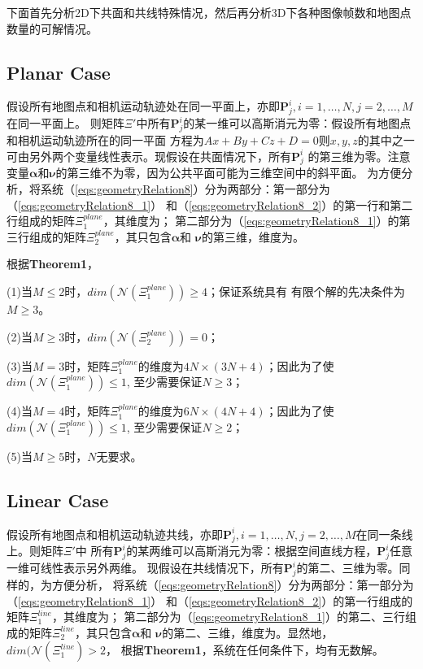 \documentclass{article}
\begin{document}
下面首先分析2D下共面和共线特殊情况，然后再分析3D下各种图像帧数和地图点数量的可解情况。
\subsection{Planar Case}
假设所有地图点和相机运动轨迹处在同一平面上，亦即$\textbf{P}_j^i,i=1,\dots,N,j=2,\dots,M$在同一平面上。
则矩阵$\Xi'$中所有$\textbf{P}_j^i$的某一维可以高斯消元为零：假设所有地图点和相机运动轨迹所在的同一平面
方程为$Ax+By+Cz+D=0$则$x,y,z$的其中之一可由另外两个变量线性表示。现假设在共面情况下，所有$\textbf{P}_j^i$
的第三维为零。注意变量$\mathbf{\alpha}$和$\mathbf{\nu}$的第三维不为零，因为公共平面可能为三维空间中的斜平面。
为方便分析，将系统（\ref{eqs:geometryRelation8}）分为两部分：第一部分为（\ref{eqs:geometryRelation8_1}）
和（\ref{eqs:geometryRelation8_2}）的第一行和第二行组成的矩阵$\Xi_1^{plane}$，其维度为{\color{red}{$2(M-1)N\times (MN+4)$}}；
第二部分为（\ref{eqs:geometryRelation8_1}）的第三行组成的矩阵$\Xi_2^{plane}$，其只包含$\mathbf{\alpha}$和
$\mathbf{\nu}$的第三维，维度为{\color{red}{$(M-1)\times 2$}}。
\par
根据\textbf{Theorem1}，
\par
(1)当$M\leqslant 2$时，$dim(\mathcal{N}(\Xi_1^{plane}))\geqslant 4$；保证系统具有
有限个解的先决条件为$M\geqslant 3$。
\par
(2)当$M\geqslant 3$时，$dim(\mathcal{N}(\Xi_2^{plane}))=0$；
\par
(3)当$M=3$时，矩阵$\Xi_1^{plane}$的维度为$4N\times (3N+4)$；因此为了使$dim(\mathcal{N}(\Xi_1^{plane}))\leqslant 1$,
至少需要保证$N\geqslant 3$；
\par
(4)当$M=4$时，矩阵$\Xi_1^{plane}$的维度为$6N\times (4N+4)$；因此为了使$dim(\mathcal{N}(\Xi_1^{plane}))\leqslant 1$,
至少需要保证$N\geqslant 2$；
\par
(5)当$M\geqslant 5$时，$N$无要求。

\subsection{Linear Case}
假设所有地图点和相机运动轨迹共线，亦即$\textbf{P}_j^i,i=1,\dots,N,j=2,\dots,M$在同一条线上。则矩阵$\Xi'$中
所有$\textbf{P}_j^i$的某两维可以高斯消元为零：根据空间直线方程，$\textbf{P}_j^i$任意一维可线性表示另外两维。
现假设在共线情况下，所有$\textbf{P}_j^i$的第二、三维为零。同样的，为方便分析，
将系统（\ref{eqs:geometryRelation8}）分为两部分：第一部分为（\ref{eqs:geometryRelation8_1}）
和（\ref{eqs:geometryRelation8_2}）的第一行组成的矩阵$\Xi_1^{line}$，其维度为{\color{red}{$(M-1)N\times (MN+2)$}}；
第二部分为（\ref{eqs:geometryRelation8_1}）的第二、三行组成的矩阵$\Xi_2^{line}$，其只包含$\mathbf{\alpha}$和
$\mathbf{\nu}$的第二、三维，维度为{\color{red}{$2(M-1)\times 4$}}。显然地，$dim(\mathcal{N}(\Xi_1^{line})>2$，
根据\textbf{Theorem1}，系统在任何条件下，均有无数解。
\end{document}
